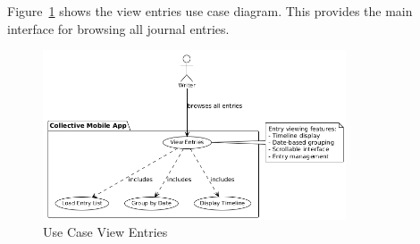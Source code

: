 Figure~\ref{fig:usecase-view-entries} shows the view entries use case diagram. This provides the main interface for browsing all journal entries.

\begin{figure}[H]
\centering
\includegraphics[width=0.8\textwidth]{files/imgs/usecase_U9ojah5omZ.png}
\caption{Use Case View Entries}
\label{fig:usecase-view-entries}
\end{figure}

